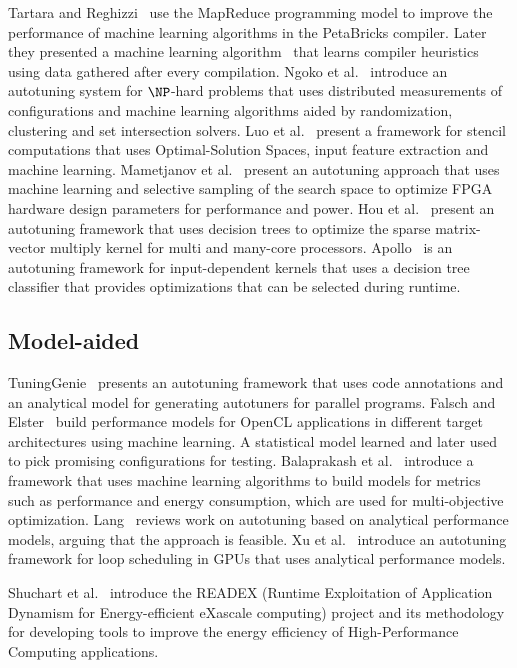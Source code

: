 Tartara and Reghizzi~\cite{tartara2012parallel} use the MapReduce programming
model to improve the performance of machine learning algorithms in the
PetaBricks compiler. Later they presented a machine learning
algorithm~\cite{tartara2013continuous} that learns compiler heuristics using
data gathered after every compilation.  Ngoko et al.~\cite{ngoko2016automatic}
introduce an autotuning system for $\NP$-hard problems that uses distributed
measurements of configurations and machine learning algorithms aided by
randomization, clustering and set intersection solvers.  Luo et
al.~\cite{luo2015fast} present a framework for stencil computations that uses
Optimal-Solution Spaces, input feature extraction and machine learning.
Mametjanov et al.~\cite{mametjanov2015autotuning} present an autotuning
approach that uses machine learning and selective sampling of the search space
to optimize FPGA hardware design parameters for performance and power.  Hou et
al.~\cite{hou2017auto} present an autotuning framework that uses decision trees
to optimize the sparse matrix-vector multiply kernel for multi and many-core
processors.  Apollo~\cite{beckingsale2017apollo} is an autotuning framework for
input-dependent kernels that uses a decision tree classifier that provides
optimizations that can be selected during runtime.

\subsection{Model-aided}

TuningGenie~\cite{ivanenko2014method} presents an autotuning framework that
uses code annotations and an analytical model for generating autotuners for
parallel programs.  Falsch and Elster~\cite{falch2017machine} build performance
models for OpenCL applications in different target architectures using machine
learning.  A statistical model learned and later used to pick promising
configurations for testing.  Balaprakash et al.~\cite{balaprakash2016automomml}
introduce a framework that uses machine learning algorithms to build models for
metrics such as performance and energy consumption, which are used for
multi-objective optimization.
Lang~\cite{lang2017data} reviews work on autotuning based on analytical
performance models, arguing that the approach is feasible.
Xu et al.~\cite{xu2016analytical} introduce an autotuning framework for
loop scheduling in GPUs that uses analytical performance models.

Shuchart et al.~\cite{schuchart2017readex} introduce the READEX (Runtime
Exploitation of Application Dynamism for Energy-efficient eXascale computing)
project and its methodology for developing tools to improve the energy
efficiency of High-Performance Computing applications.

